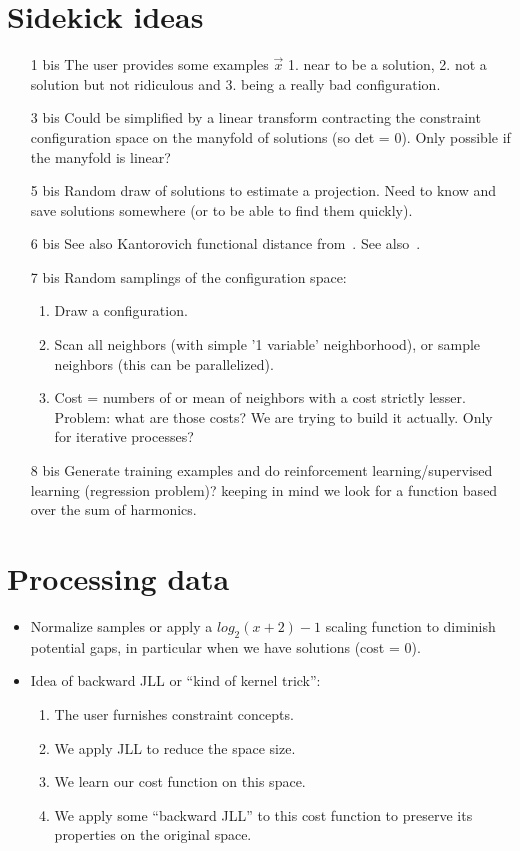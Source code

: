 \documentclass[a4paper, 12pt]{article}
\begin{document}
\section{Sidekick ideas}
\begin{itemize}
\item[1 bis] The user provides some examples $\vec{x}$ 1. near to be a solution, 2. not a solution but not ridiculous and 3. being a really bad configuration.
\item[3 bis] Could be simplified by a linear transform contracting the constraint configuration space on the manyfold of solutions (so det = 0). Only possible if the manyfold is linear?
\item[5 bis] Random draw of solutions to estimate a projection. Need to know and save solutions somewhere (or to be able to find them quickly).
\item   [6    bis]   See   also   Kantorovich    functional   distance
  from~\cite{StochCP}. See also~\cite{metrics}.
\item [7 bis] Random samplings of the configuration space:
  \begin{enumerate}
  \item Draw a configuration.
  \item Scan all neighbors (with simple '1 variable' neighborhood), or
    sample neighbors (this can be parallelized).
  \item Cost  = numbers of or  mean of neighbors with  a cost strictly
    lesser. Problem: what  are those costs? We are trying  to build it
    actually. Only for iterative processes?
  \end{enumerate}
\item [8 bis] Generate training examples and do reinforcement learning/supervised learning (regression problem)? keeping in mind we look for a function based over the sum of harmonics.
\end{itemize}

\section{Processing data}
\begin{itemize}
\item Normalize samples or apply  a $log_2(x+2)-1$ scaling function to
  diminish potential gaps, in particular  when we have solutions (cost
  = 0).
\item Idea of backward JLL or ``kind of kernel trick'':
  \begin{enumerate}
  \item The user furnishes constraint concepts.
  \item We apply JLL to reduce the space size.
  \item We learn our cost function on this space.
  \item  We apply  some  ``backward  JLL'' to  this  cost function  to
    preserve its properties on the original space.
  \end{enumerate}
\end{itemize}
\end{document}

